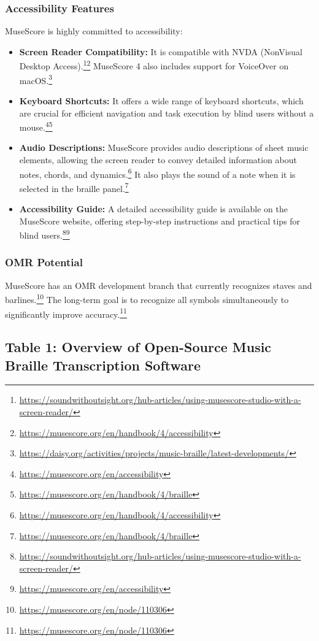 \subsubsection{Accessibility Features}
MuseScore is highly committed to accessibility:
\begin{itemize}
    \item \textbf{Screen Reader Compatibility:} It is compatible with NVDA (NonVisual Desktop Access).\footnote{\url{https://soundwithoutsight.org/hub-articles/using-musescore-studio-with-a-screen-reader/}}\footnote{\url{https://musescore.org/en/handbook/4/accessibility}} MuseScore 4 also includes support for VoiceOver on macOS.\footnote{\url{https://daisy.org/activities/projects/music-braille/latest-developments/}}
    \item \textbf{Keyboard Shortcuts:} It offers a wide range of keyboard shortcuts, which are crucial for efficient navigation and task execution by blind users without a mouse.\footnote{\url{https://musescore.org/en/accessibility}}\footnote{\url{https://musescore.org/en/handbook/4/braille}}
    \item \textbf{Audio Descriptions:} MuseScore provides audio descriptions of sheet music elements, allowing the screen reader to convey detailed information about notes, chords, and dynamics.\footnote{\url{https://musescore.org/en/handbook/4/accessibility}} It also plays the sound of a note when it is selected in the braille panel.\footnote{\url{https://musescore.org/en/handbook/4/braille}}
    \item \textbf{Accessibility Guide:} A detailed accessibility guide is available on the MuseScore website, offering step-by-step instructions and practical tips for blind users.\footnote{\url{https://soundwithoutsight.org/hub-articles/using-musescore-studio-with-a-screen-reader/}}\footnote{\url{https://musescore.org/en/accessibility}}
\end{itemize}

\subsubsection{OMR Potential}
MuseScore has an OMR development branch that currently recognizes staves and barlines.\footnote{\url{https://musescore.org/en/node/110306}} The long-term goal is to recognize all symbols simultaneously to significantly improve accuracy.\footnote{\url{https://musescore.org/en/node/110306}}

\subsection{Table 1: Overview of Open-Source Music Braille Transcription Software}

